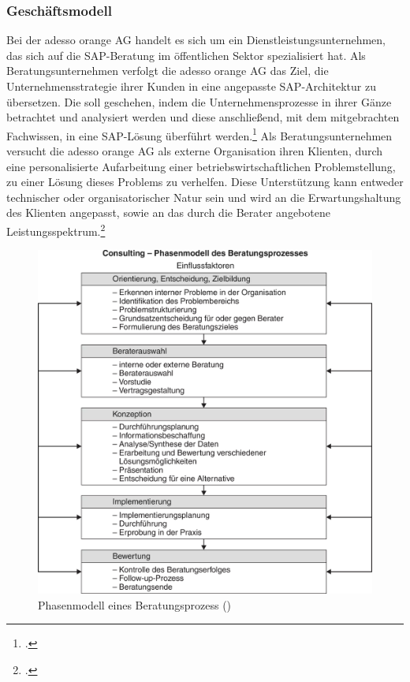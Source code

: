 \subsubsection{Geschäftsmodell}
Bei der adesso orange AG handelt es sich um ein Dienstleistungsunternehmen, das sich auf die SAP-Beratung im öffentlichen Sektor spezialisiert hat. Als Beratungsunternehmen verfolgt die adesso orange AG das Ziel, die Unternehmensstrategie ihrer Kunden in eine angepasste SAP-Architektur zu übersetzen. Die soll geschehen, indem die Unternehmensprozesse in ihrer Gänze betrachtet und analysiert werden und diese anschließend, mit dem mitgebrachten Fachwissen, in eine SAP-Lösung überführt werden.\footcite[Vgl.][]{ao-main} Als Beratungsunternehmen versucht die adesso orange AG als externe Organisation ihren Klienten, durch eine personalisierte Aufarbeitung einer betriebswirtschaftlichen Problemstellung, zu einer Lösung dieses Problems zu verhelfen. Diese Unterstützung kann entweder technischer oder organisatorischer Natur sein und wird an die Erwartungshaltung des Klienten angepasst, sowie an das durch die Berater angebotene Leistungsspektrum.\footcite[Vgl.][]{gabler-beratung}
\begin{figure}[h!]
    \centering
    \includegraphics[scale=0.4]{./Bilder/Beratungsprozess.png}
    \caption[Phasenmodell eines Beratungsprozess]{Phasenmodell eines Beratungsprozess (\cite[Vgl.][]{gabler-beratung})}
\end{figure}
